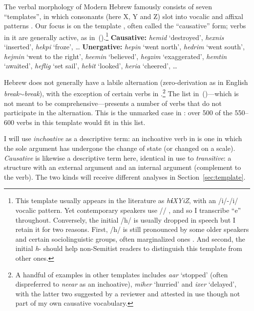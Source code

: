 The verbal morphology of Modern Hebrew famously consists of seven ``templates'', in which consonants (here X, Y and Z) slot into vocalic and affixal patterns \citep{doron03,arad05,borer13oup,kastner16phd}. Our focus is on the template {\thif}, often called the ``causative'' form; verbs in it are generally active, as in~(\nextx).\footnote{This template usually appears in the literature as \emph{h\textbf{i}XYiZ}, with an /i/-/i/ vocalic pattern. Yet contemporary speakers use // \citep{trachtman16}, and so I transcribe ``e'' throughout. Conversely, the initial /h/ is usually dropped in speech but I retain it for two reasons. First, /h/ is still pronounced by some older speakers and certain sociolinguistic groups, often marginalized ones \citep[cf.~][]{schwarzwald81biu,gafter14phd}. And second, the initial \emph{h}- should help non-Semitist readers to distinguish this template from other ones.}
\pex\label{ex:thif-active}
	\a \textbf{Causative:} \emph{hemid} `destroyed', \emph{hexnis} `inserted', \emph{hekpi} `froze', \dots
	\a \textbf{Unergative:} \emph{he{\texttslig}pin} `went north', \emph{hedrim} `went south', \emph{hejmin} `went to the right', \emph{heemin} `believed', \emph{hegzim} `exaggerated', \emph{hemtin} `awaited', \emph{heflig} `set sail', \emph{hebit} `looked', \emph{heria} `cheered', \dots
\xe

Hebrew does not generally have a labile alternation (zero-derivation as in English \emph{break}$\sim$\emph{break}), with the exception of certain verbs in {\thif}.\footnote{A handful of examples in other templates includes \emph{a{\texttslig}ar} `stopped' (often dispreferred to \emph{nee{\texttslig}ar} as an inchoative), \emph{miher} `hurried' and \emph{ixer} `delayed', with the latter two suggested by a reviewer and attested in use though not part of my own causative vocabulary.} The list in~(\lastx)---which is not meant to be comprehensive---presents a number of verbs that do not participate in the alternation. This is the unmarked case in \thif: over 500 of the 550--600 verbs in this template would fit in this list.

I will use \emph{inchoative} as a descriptive term: an inchoative verb in {\thif} is one in which the sole argument has undergone the change of state (or changed on a scale). \emph{Causative} is likewise a descriptive term here, identical in use to \emph{transitive}: a structure with an external argument and an internal argument (complement to the verb). The two kinds will receive different analyses in Section~\ref{sec:template}.

